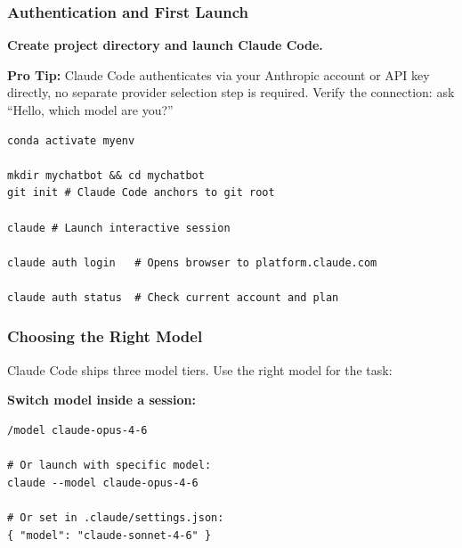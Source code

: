 \begin{frame}[fragile]\frametitle{Authentication and First Launch}
\textbf{Create project directory and launch Claude Code.}

\textbf{Pro Tip:} Claude Code authenticates via your Anthropic account or API key directly, no separate provider selection step is required. Verify the connection: ask ``Hello, which model are you?''


\begin{lstlisting}
conda activate myenv

mkdir mychatbot && cd mychatbot
git init # Claude Code anchors to git root

claude # Launch interactive session

claude auth login   # Opens browser to platform.claude.com

claude auth status  # Check current account and plan
\end{lstlisting}
\end{frame}


\begin{frame}[fragile]\frametitle{Choosing the Right Model}
Claude Code ships three model tiers. Use the right model for the task:

\begin{center}
\end{center}

\textbf{Switch model inside a session:}
\begin{lstlisting}
/model claude-opus-4-6

# Or launch with specific model:
claude --model claude-opus-4-6

# Or set in .claude/settings.json:
{ "model": "claude-sonnet-4-6" }
\end{lstlisting}

\end{frame}


